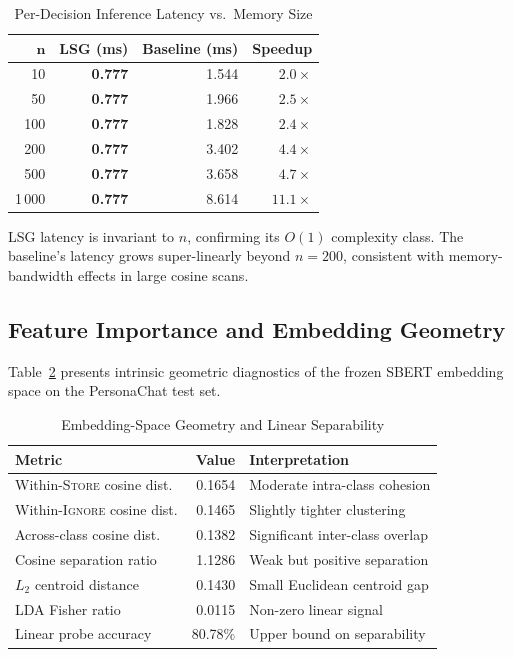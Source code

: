 \documentclass[conference]{IEEEtran}
\begin{document}
\begin{table}[h!]
  \centering
  \caption{Per-Decision Inference Latency vs.\ Memory Size}
  \label{tab:latency}
  \renewcommand{\arraystretch}{1.2}
  \begin{tabular}{@{}rrrr@{}}
    \toprule
    $\bm{n}$ & \textbf{LSG (ms)} & \textbf{Baseline (ms)} & \textbf{Speedup} \\
    \midrule
    10      & \textbf{0.777} & 1.544 & $2.0\times$ \\
    50      & \textbf{0.777} & 1.966 & $2.5\times$ \\
    100     & \textbf{0.777} & 1.828 & $2.4\times$ \\
    200     & \textbf{0.777} & 3.402 & $4.4\times$ \\
    500     & \textbf{0.777} & 3.658 & $4.7\times$ \\
    1\,000  & \textbf{0.777} & 8.614 & $\mathbf{11.1\times}$ \\
    \bottomrule
  \end{tabular}
\end{table}

LSG latency is invariant to $n$, confirming its $O(1)$
complexity class.
The baseline's latency grows super-linearly beyond $n{=}200$,
consistent with memory-bandwidth effects in large cosine
scans.

\subsection{Feature Importance and Embedding Geometry}
Table~\ref{tab:geometry} presents intrinsic geometric
diagnostics of the frozen SBERT embedding space on the
PersonaChat test set.

\begin{table}[h!]
  \centering
  \caption{Embedding-Space Geometry and Linear Separability}
  \label{tab:geometry}
  \renewcommand{\arraystretch}{1.2}
  \begin{tabular}{@{}lrp{3.2cm}@{}}
    \toprule
    \textbf{Metric} & \textbf{Value} & \textbf{Interpretation} \\
    \midrule
    Within-\textsc{Store} cosine dist.  & 0.1654  & Moderate intra-class cohesion \\
    Within-\textsc{Ignore} cosine dist. & 0.1465  & Slightly tighter clustering \\
    Across-class cosine dist.           & 0.1382  & Significant inter-class overlap \\
    Cosine separation ratio             & 1.1286  & Weak but positive separation \\
    $L_2$ centroid distance             & 0.1430  & Small Euclidean centroid gap \\
    LDA Fisher ratio                    & 0.0115  & Non-zero linear signal \\
    Linear probe accuracy               & 80.78\% & Upper bound on separability \\
    \bottomrule
  \end{tabular}
\end{table}
\end{document}
